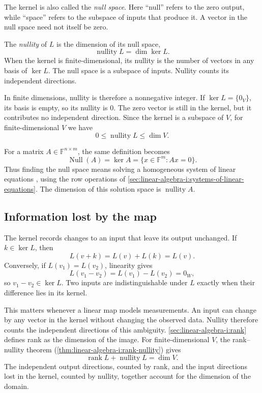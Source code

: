 The kernel is also called the \emph{null space}. Here ``null'' refers to
the zero output, while ``space'' refers to the subspace of inputs that
produce it. A vector in the null space need not itself be zero.

The \emph{nullity} of \(L\) is the dimension of its null space,
\[
  \operatorname{nullity}L=\dim\ker L.
\]
When the kernel is finite-dimensional, its nullity is the number of vectors
in any basis of \(\ker L\). The null space is a subspace of inputs.
Nullity counts its independent directions.

In finite dimensions, nullity is therefore a nonnegative integer.
If \(\ker L=\{0_V\}\), its basis is empty, so its nullity is \(0\).
The zero vector is still in the kernel, but it contributes no independent
direction. Since the kernel is a subspace of \(V\), for finite-dimensional
\(V\) we have
\[
  0\leq\operatorname{nullity}L\leq\dim V.
\]

For a matrix \(A\in\mathbb F^{n\times m}\), the same definition becomes
\[
  \operatorname{Null}(A)=\ker A
    =\{x\in\mathbb F^m:Ax=0\}.
\]
Thus finding the null space means solving a homogeneous system of linear
equations \cite{MargalitRabinoffSubspaces}, using the row operations of
\autoref{sec:linear-algebra-i:systems-of-linear-equations}.
The dimension of this solution space is \(\operatorname{nullity}A\).

\subsection{Information lost by the map}

The kernel records changes to an input that leave its output unchanged.
If \(k\in\ker L\), then
\[
  L(v+k)=L(v)+L(k)=L(v).
\]
Conversely, if \(L(v_1)=L(v_2)\), linearity gives
\[
  L(v_1-v_2)=L(v_1)-L(v_2)=0_W,
\]
so \(v_1-v_2\in\ker L\). Two inputs are indistinguishable under \(L\)
exactly when their difference lies in its kernel.

This matters whenever a linear map models measurements. An input can change
by any vector in the kernel without changing the observed data.
Nullity therefore counts the independent directions of this ambiguity.
\autoref{sec:linear-algebra-i:rank} defines rank as the dimension of
the image. For finite-dimensional \(V\), the rank--nullity theorem
(\autoref{thm:linear-algebra-i:rank-nullity}) gives
\[
  \operatorname{rank}L+\operatorname{nullity}L=\dim V.
\]
The independent output directions, counted by rank, and the input
directions lost in the kernel, counted by nullity, together account for
the dimension of the domain.

